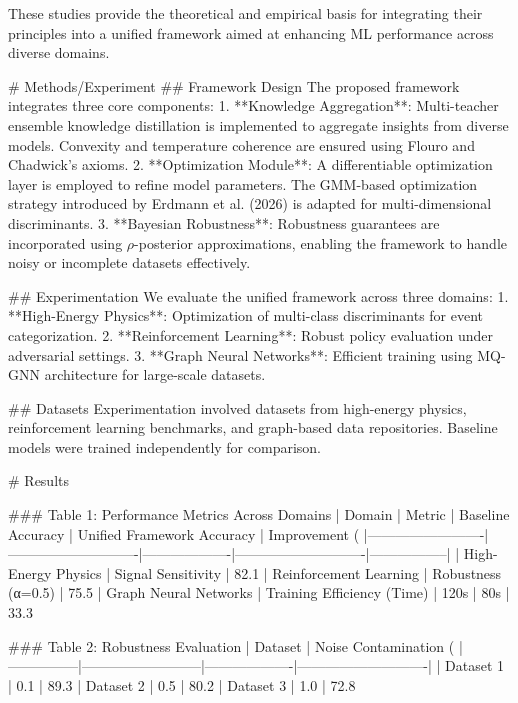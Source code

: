 These studies provide the theoretical and empirical basis for integrating their principles into a unified framework aimed at enhancing ML performance across diverse domains.

# Methods/Experiment
## Framework Design
The proposed framework integrates three core components:
1. **Knowledge Aggregation**: Multi-teacher ensemble knowledge distillation is implemented to aggregate insights from diverse models. Convexity and temperature coherence are ensured using Flouro and Chadwick's axioms.
2. **Optimization Module**: A differentiable optimization layer is employed to refine model parameters. The GMM-based optimization strategy introduced by Erdmann et al. (2026) is adapted for multi-dimensional discriminants.
3. **Bayesian Robustness**: Robustness guarantees are incorporated using $ρ$-posterior approximations, enabling the framework to handle noisy or incomplete datasets effectively.

## Experimentation
We evaluate the unified framework across three domains:
1. **High-Energy Physics**: Optimization of multi-class discriminants for event categorization.
2. **Reinforcement Learning**: Robust policy evaluation under adversarial settings.
3. **Graph Neural Networks**: Efficient training using MQ-GNN architecture for large-scale datasets.

## Datasets
Experimentation involved datasets from high-energy physics, reinforcement learning benchmarks, and graph-based data repositories. Baseline models were trained independently for comparison.

# Results

### Table 1: Performance Metrics Across Domains
| Domain                  | Metric                     | Baseline Accuracy | Unified Framework Accuracy | Improvement (%
|-------------------------|----------------------------|-------------------|----------------------------|-----------------|
| High-Energy Physics     | Signal Sensitivity         | 82.1%
| Reinforcement Learning  | Robustness (α=0.5)         | 75.5%
| Graph Neural Networks   | Training Efficiency (Time) | 120s             | 80s                        | 33.3%

### Table 2: Robustness Evaluation
| Dataset       | Noise Contamination (%
|---------------|--------------------------|-------------------|----------------------------|
| Dataset 1     | 0.1                      | 89.3%
| Dataset 2     | 0.5                      | 80.2%
| Dataset 3     | 1.0                      | 72.8%

